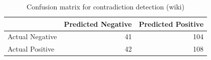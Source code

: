 \begin{table}
\caption{Confusion matrix for contradiction detection (wiki)}
\label{tab:confusion_matrix}
\begin{tabular}{lrr}
\toprule
 & Predicted Negative & Predicted Positive \\
\midrule
Actual Negative & 41 & 104 \\
Actual Positive & 42 & 108 \\
\bottomrule
\end{tabular}
\end{table}
